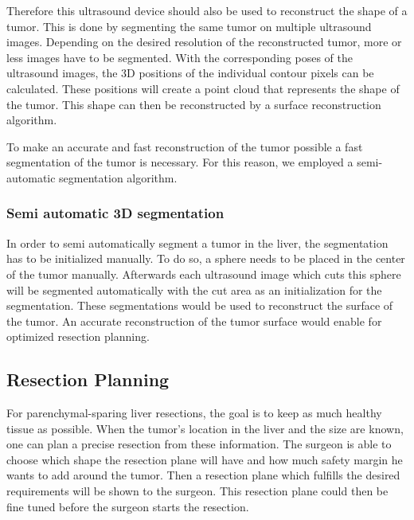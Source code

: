 Therefore this ultrasound device should also be used to
reconstruct the shape of a tumor. This is done by segmenting the same tumor on
multiple ultrasound images. Depending on the desired resolution of the
reconstructed tumor, more or less images have to be segmented. With the corresponding
poses of the ultrasound images, the 3D positions of the individual contour
pixels can be calculated. These positions will create a point cloud that
represents the shape of the tumor. This shape can then be reconstructed by a
surface reconstruction algorithm.

To make an accurate and fast reconstruction of the tumor possible a fast segmentation of the tumor is
necessary. For this reason, we employed a semi-automatic segmentation algorithm.

\subsubsection{Semi automatic 3D segmentation}
In order to semi automatically segment a tumor in the liver, the segmentation
has to be initialized manually. To do so, a sphere needs to be
placed in the center of the tumor manually. Afterwards each ultrasound image
which cuts this sphere will be segmented automatically with the cut area as
an initialization for the segmentation. These segmentations would be used to
reconstruct the surface of the tumor. An accurate reconstruction of the tumor
surface would enable for optimized resection planning.

\subsection{Resection Planning}
For parenchymal-sparing liver resections, the goal is to keep as much healthy tissue as
possible. When the tumor's location in the liver and the size are known, one can plan a
precise resection from these information. The surgeon is able to choose
which shape the resection plane will have and how much safety margin he wants to
add around the tumor. Then a resection plane which fulfills the desired requirements
will be shown to the surgeon. This resection plane could then be fine tuned before the
surgeon starts the resection.

